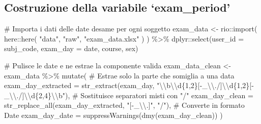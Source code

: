 \documentclass[
  11pt,
  a4paper,
  onecolumn]{article}
\newenvironment{Shaded}{}{}
\newcommand{\AttributeTok}[1]{\textcolor[rgb]{0.84,0.23,0.29}{#1}}
\newcommand{\CommentTok}[1]{\textcolor[rgb]{0.42,0.45,0.49}{#1}}
\newcommand{\FunctionTok}[1]{\textcolor[rgb]{0.44,0.26,0.76}{#1}}
\newcommand{\NormalTok}[1]{\textcolor[rgb]{0.14,0.16,0.18}{#1}}
\newcommand{\OtherTok}[1]{\textcolor[rgb]{0.44,0.26,0.76}{#1}}
\newcommand{\SpecialCharTok}[1]{\textcolor[rgb]{0.00,0.36,0.77}{#1}}
\newcommand{\StringTok}[1]{\textcolor[rgb]{0.01,0.18,0.38}{#1}}
\begin{document}
\subsection{Costruzione della variabile
`exam\_period'}\label{costruzione-della-variabile-exam_period}

\begin{Shaded}
\begin{Highlighting}[]
\CommentTok{\# Importa i dati delle date d\textquotesingle{}esame per ogni soggetto}
\NormalTok{exam\_data }\OtherTok{\textless{}{-}}\NormalTok{ rio}\SpecialCharTok{::}\FunctionTok{import}\NormalTok{(}
\NormalTok{  here}\SpecialCharTok{::}\FunctionTok{here}\NormalTok{(}
    \StringTok{"data"}\NormalTok{, }\StringTok{"raw"}\NormalTok{, }\StringTok{"exam\_data.xlsx"}
\NormalTok{  )}
\NormalTok{) }\SpecialCharTok{\%\textgreater{}\%}
\NormalTok{  dplyr}\SpecialCharTok{::}\FunctionTok{select}\NormalTok{(}\AttributeTok{user\_id =}\NormalTok{ subj\_code, }\AttributeTok{exam\_day =}\NormalTok{ date, course, sex)}
\end{Highlighting}
\end{Shaded}

\begin{Shaded}
\begin{Highlighting}[]
\CommentTok{\# Pulisce le date e ne estrae la componente valida}
\NormalTok{exam\_data\_clean }\OtherTok{\textless{}{-}}\NormalTok{ exam\_data }\SpecialCharTok{\%\textgreater{}\%}
  \FunctionTok{mutate}\NormalTok{(}
    \CommentTok{\# Estrae solo la parte che somiglia a una data}
    \AttributeTok{exam\_day\_extracted =} \FunctionTok{str\_extract}\NormalTok{(exam\_day, }\StringTok{"}\SpecialCharTok{\textbackslash{}\textbackslash{}}\StringTok{b}\SpecialCharTok{\textbackslash{}\textbackslash{}}\StringTok{d\{1,2\}[{-}\_}\SpecialCharTok{\textbackslash{}\textbackslash{}}\StringTok{./]}\SpecialCharTok{\textbackslash{}\textbackslash{}}\StringTok{d\{1,2\}[{-}\_}\SpecialCharTok{\textbackslash{}\textbackslash{}}\StringTok{./]}\SpecialCharTok{\textbackslash{}\textbackslash{}}\StringTok{d\{2,4\}}\SpecialCharTok{\textbackslash{}\textbackslash{}}\StringTok{b"}\NormalTok{),}
    \CommentTok{\# Sostituisce separatori misti con "/"}
    \AttributeTok{exam\_day\_clean =} \FunctionTok{str\_replace\_all}\NormalTok{(exam\_day\_extracted, }\StringTok{"[{-}\_}\SpecialCharTok{\textbackslash{}\textbackslash{}}\StringTok{.]"}\NormalTok{, }\StringTok{"/"}\NormalTok{),}
    \CommentTok{\# Converte in formato Date}
    \AttributeTok{exam\_day\_date =} \FunctionTok{suppressWarnings}\NormalTok{(}\FunctionTok{dmy}\NormalTok{(exam\_day\_clean))}
\NormalTok{  )}
\end{Highlighting}
\end{Shaded}
\end{document}

